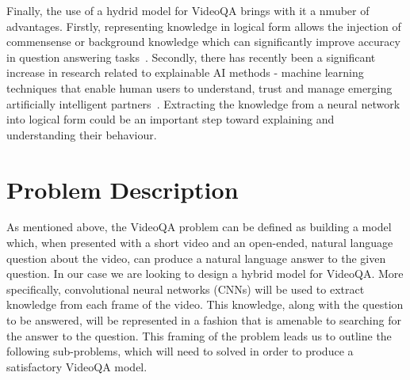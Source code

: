 \documentclass[../interim.tex]{subfiles}
\begin{document}
Finally, the use of a hydrid model for VideoQA brings with it a nmuber of advantages. Firstly, representing knowledge in logical form allows the injection of commensense or background knowledge which can significantly improve accuracy in question answering tasks~\cite{motivation:external-knowledge}. Secondly, there has recently been a significant increase in research related to explainable AI methods - machine learning techniques that enable human users to understand, trust and manage emerging artificially intelligent partners~\cite{def:xai}. Extracting the knowledge from a neural network into logical form could be an important step toward explaining and understanding their behaviour.


\section{Problem Description}

As mentioned above, the VideoQA problem can be defined as building a model which, when presented with a short video and an open-ended, natural language question about the video, can produce a natural language answer to the given question. In our case we are looking to design a hybrid model for VideoQA. More specifically, convolutional neural networks (CNNs) will be used to extract knowledge from each frame of the video. This knowledge, along with the question to be answered, will be represented in a fashion that is amenable to searching for the answer to the question. This framing of the problem leads us to outline the following sub-problems, which will need to solved in order to produce a satisfactory VideoQA model.
\end{document}
